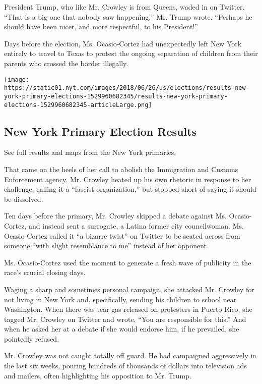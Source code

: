 President Trump, who like Mr. Crowley is from Queens, waded in on
Twitter. ``That is a big one that nobody saw happening,'' Mr. Trump
wrote. ``Perhaps he should have been nicer, and more respectful, to his
President!''

Days before the election, Ms. Ocasio-Cortez had unexpectedly left New
York entirely to travel to Texas to protest the ongoing separation of
children from their parents who crossed the border illegally.

\href{https://www.nytimes.com/interactive/2018/06/26/us/elections/results-new-york-primary-elections.html}{}

\texttt{[image: https://static01.nyt.com/images/2018/06/26/us/elections/results-new-york-primary-elections-1529960682345/results-new-york-primary-elections-1529960682345-articleLarge.png]}

\hypertarget{new-york-primary-election-results}{%
\subsection{New York Primary Election
Results}\label{new-york-primary-election-results}}

See full results and maps from the New York primaries.

That came on the heels of her call to abolish the Immigration and
Customs Enforcement agency. Mr. Crowley heated up his own rhetoric in
response to her challenge, calling it a ``fascist organization,'' but
stopped short of saying it should be dissolved.

Ten days before the primary, Mr. Crowley skipped a debate against Ms.
Ocasio-Cortez, and instead sent a surrogate, a Latina former city
councilwoman. Ms. Ocasio-Cortez called it ``a bizarre twist'' on Twitter
to be seated across from someone ``with slight resemblance to me''
instead of her opponent.

Ms. Ocasio-Cortez used the moment to generate a fresh wave of publicity
in the race's crucial closing days.

Waging a sharp and sometimes personal campaign, she attacked Mr. Crowley
for not living in New York and, specifically, sending his children to
school near Washington. When there was tear gas released on protesters
in Puerto Rico, she tagged Mr. Crowley on Twitter and wrote, ``You are
responsible for this.'' And when he asked her at a debate if she would
endorse him, if he prevailed, she pointedly refused.

Mr. Crowley was not caught totally off guard. He had campaigned
aggressively in the last six weeks, pouring hundreds of thousands of
dollars into television ads and mailers, often highlighting his
opposition to Mr. Trump.

